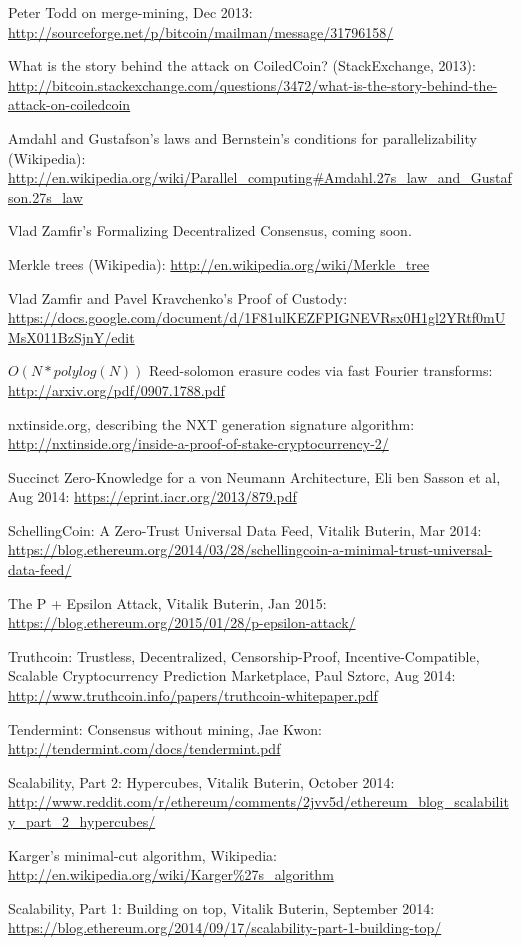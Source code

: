 \documentclass[11pt,a4paper]{report}
\theoremstyle{plain}
\theoremstyle{definition}
\theoremstyle{remark}
\begin{document}
\begin{thebibliography}{2}

    Peter Todd on merge-mining, Dec 2013: \url{http://sourceforge.net/p/bitcoin/mailman/message/31796158/}

    What is the story behind the attack on CoiledCoin? (StackExchange, 2013): \url{http://bitcoin.stackexchange.com/questions/3472/what-is-the-story-behind-the-attack-on-coiledcoin}

    Amdahl and Gustafson's laws and Bernstein's conditions for parallelizability (Wikipedia): \url{http://en.wikipedia.org/wiki/Parallel_computing#Amdahl.27s_law_and_Gustafson.27s_law}

    Vlad Zamfir's Formalizing Decentralized Consensus, coming soon.

    Merkle trees (Wikipedia): \url{http://en.wikipedia.org/wiki/Merkle_tree}

    Vlad Zamfir and Pavel Kravchenko's Proof of Custody: \url{https://docs.google.com/document/d/1F81ulKEZFPIGNEVRsx0H1gl2YRtf0mUMsX011BzSjnY/edit}

    $O(N*polylog(N))$ Reed-solomon erasure codes via fast Fourier transforms: \url{http://arxiv.org/pdf/0907.1788.pdf}

    nxtinside.org, describing the NXT generation signature algorithm: \url{http://nxtinside.org/inside-a-proof-of-stake-cryptocurrency-2/}

    Succinct Zero-Knowledge for a von Neumann Architecture, Eli ben Sasson et al, Aug 2014: \url{https://eprint.iacr.org/2013/879.pdf}

    SchellingCoin: A Zero-Trust Universal Data Feed, Vitalik Buterin, Mar 2014: \url{https://blog.ethereum.org/2014/03/28/schellingcoin-a-minimal-trust-universal-data-feed/}

    The P + Epsilon Attack, Vitalik Buterin, Jan 2015: \url{https://blog.ethereum.org/2015/01/28/p-epsilon-attack/}

    Truthcoin: Trustless, Decentralized, Censorship-Proof, Incentive-Compatible, Scalable Cryptocurrency Prediction Marketplace, Paul Sztorc, Aug 2014: \url{http://www.truthcoin.info/papers/truthcoin-whitepaper.pdf}

    Tendermint: Consensus without mining, Jae Kwon: \url{http://tendermint.com/docs/tendermint.pdf}

    Scalability, Part 2: Hypercubes, Vitalik Buterin, October 2014: \url{http://www.reddit.com/r/ethereum/comments/2jvv5d/ethereum_blog_scalability_part_2_hypercubes/}

    Karger's minimal-cut algorithm, Wikipedia: \url{http://en.wikipedia.org/wiki/Karger%27s_algorithm}

    Scalability, Part 1: Building on top, Vitalik Buterin, September 2014: \url{https://blog.ethereum.org/2014/09/17/scalability-part-1-building-top/}

\end{thebibliography}
\end{document}
